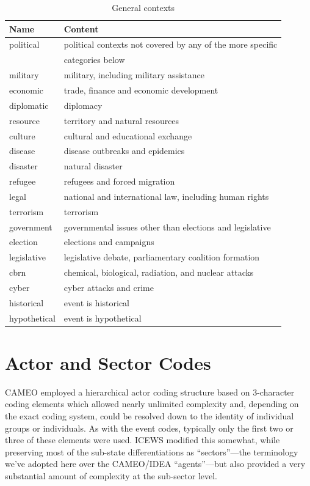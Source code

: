\documentclass[11pt]{report}
\begin{document}
\begin{table}[htp]
\caption{General contexts }
\begin{center}
\begin{tabular}{|l|l|}
\hline
Name & Content \\
\hline
political & political contexts not covered by any of the more specific \\
& categories below\\
military & military, including military assistance \\
economic & trade, finance and economic development \\
diplomatic & diplomacy \\
resource & territory and natural resources \\
culture & cultural and educational exchange \\
disease & disease outbreaks and epidemics \\
disaster & natural disaster \\
refugee & refugees and forced migration \\
legal & national and international law, including human rights \\ 
terrorism & terrorism \\
government & governmental issues other than elections and legislative \\
election & elections and campaigns \\
legislative & legislative debate, parliamentary coalition formation \\
cbrn &chemical, biological, radiation, and nuclear attacks  \\
cyber & cyber attacks and crime\\
historical & event is historical\\
hypothetical & event is hypothetical\\
\hline
\end{tabular}
\end{center}
\label{tab:context}

\end{table}%


\chapter{Actor and Sector Codes}

CAMEO employed a hierarchical actor coding structure based on 3-character coding elements which allowed nearly unlimited complexity and, depending on the exact coding system, could be resolved down to the identity of individual groups or individuals. As with the event codes, typically only the first two or three of these elements were used. ICEWS modified this somewhat, while preserving most of the sub-state differentiations as ``sectors''---the terminology we've adopted here over the CAMEO/IDEA ``agents''---but also provided a very substantial amount of complexity at the sub-sector level.
\end{document}
